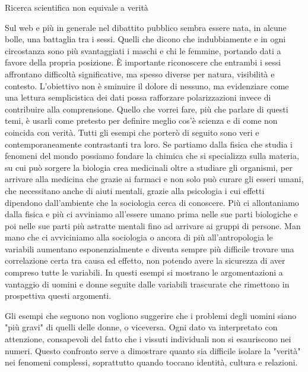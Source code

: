 \documentclass[12pt]{book} %
\begin{document}
\begin{mdframed}[linewidth=1pt]
Ricerca scientifica non equivale a verità

Sul web e più in generale nel dibattito pubblico sembra essere nata, in alcune bolle, una battaglia tra i sessi. Quelli che dicono che indubbiamente e in ogni circostanza sono più svantaggiati i maschi e chi le femmine, portando dati a favore della propria posizione.
È importante riconoscere che entrambi i sessi affrontano difficoltà significative, ma spesso diverse per natura, visibilità e contesto. L'obiettivo non è sminuire il dolore di nessuno, ma evidenziare come una lettura semplicistica dei dati possa rafforzare polarizzazioni invece di contribuire alla comprensione.
Quello che vorrei fare, più che parlare di questi temi, è usarli come pretesto per definire meglio cos'è scienza e di come non coincida con verità. Tutti gli esempi che porterò di seguito sono veri e contemporaneamente contrastanti tra loro. 
Se partiamo dalla fisica che studia i fenomeni del mondo possiamo fondare la chimica che si specializza sulla materia, su cui può sorgere la biologia crea medicinali oltre a studiare gli organismi, per arrivare alla medicina che grazie ai farmaci e non solo può curare gli esseri umani, che necessitano anche di aiuti mentali, grazie alla psicologia i cui effetti dipendono dall'ambiente che la sociologia cerca di conoscere. Più ci allontaniamo dalla fisica e più ci avviniamo all'essere umano prima nelle sue parti biologiche e poi nelle sue parti più astratte mentali fino ad arrivare ai gruppi di persone. Man mano che ci avviciniamo alla sociologia o ancora di più all'antropologia le variabili aumentano esponenzialmente e diventa sempre più difficile trovare una correlazione certa tra causa ed effetto, non potendo avere la sicurezza di aver compreso tutte le variabili. 
In questi esempi si mostrano le argomentazioni a vantaggio di uomini e donne seguite dalle variabili trascurate che rimettono in prospettiva questi argomenti.

Gli esempi che seguono non vogliono suggerire che i problemi degli uomini siano "più gravi" di quelli delle donne, o viceversa. Ogni dato va interpretato con attenzione, consapevoli del fatto che i vissuti individuali non si esauriscono nei numeri. Questo confronto serve a dimostrare quanto sia difficile isolare la "verità" nei fenomeni complessi, soprattutto quando toccano identità, cultura e relazioni.


\end{mdframed}
\end{document}
